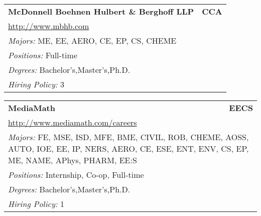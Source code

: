 \documentclass[twoside]{article}
\begin{document}
\begin{center}
\begin{multicols}{3}
\begin{FlushLeft}
\begin{minipage}{\columnwidth}
\end{minipage}
 
\begin{minipage}{\columnwidth}\begin{tabularx}{.95\columnwidth}{Xr}
                 {\Large\bf McDonnell Boehnen Hulbert \& Berghoff LLP} & {\Large\bf CCA}\\
    \multicolumn{2}{p{.95\columnwidth}}{\url{http://www.mbhb.com}}\\
    \multicolumn{2}{p{.95\columnwidth}}{\emph{Majors:} ME, EE, AERO, CE, EP, CS, CHEME}\\
    \multicolumn{2}{p{.95\columnwidth}}{\emph{Positions:} Full-time}\\
    \multicolumn{2}{p{.95\columnwidth}}{\emph{Degrees:} Bachelor's,Master's,Ph.D.}\\
    \multicolumn{2}{p{.95\columnwidth}}{\emph{Hiring Policy:} 3}\\
    \end{tabularx}
    
\end{minipage}
 
\begin{minipage}{\columnwidth}\begin{tabularx}{.95\columnwidth}{Xr}
                 {\Large\bf MediaMath} & {\Large\bf EECS}\\
    \multicolumn{2}{p{.95\columnwidth}}{\url{http://www.mediamath.com/careers}}\\
    \multicolumn{2}{p{.95\columnwidth}}{\emph{Majors:} FE, MSE, ISD, MFE, BME, CIVIL, ROB, CHEME, AOSS, AUTO, IOE, EE, IP, NERS, AERO, CE, ESE, ENT, ENV, CS, EP, ME, NAME, APhys, PHARM, EE:S}\\
    \multicolumn{2}{p{.95\columnwidth}}{\emph{Positions:} Internship, Co-op, Full-time}\\
    \multicolumn{2}{p{.95\columnwidth}}{\emph{Degrees:} Bachelor's,Master's,Ph.D.}\\
    \multicolumn{2}{p{.95\columnwidth}}{\emph{Hiring Policy:} 1}\\
    \end{tabularx}
    
\end{minipage}
 

\end{FlushLeft}
\end{multicols}
\end{center}
\end{document}
